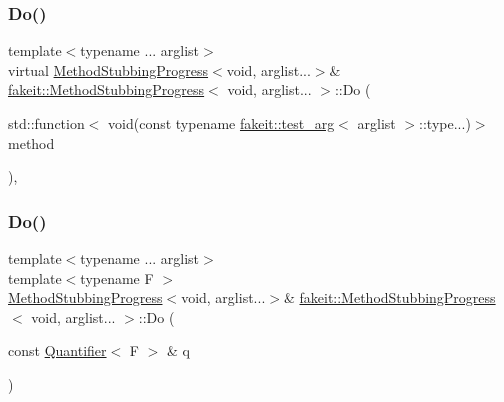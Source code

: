 \mbox{\label{structfakeit_1_1MethodStubbingProgress_3_01void_00_01arglist_8_8_8_01_4_ae41031c8833fad09c16cbbc89569918b}} 
\subsubsection{\texorpdfstring{Do()}{Do()}\hspace{0.1cm}{\footnotesize\ttfamily [16/27]}}
{\footnotesize\ttfamily template$<$typename ... arglist$>$ \\
virtual \mbox{\hyperlink{structfakeit_1_1MethodStubbingProgress}{Method\+Stubbing\+Progress}}$<$void, arglist...$>$\& \mbox{\hyperlink{structfakeit_1_1MethodStubbingProgress}{fakeit\+::\+Method\+Stubbing\+Progress}}$<$ void, arglist... $>$\+::Do (\begin{DoxyParamCaption}\item[{std\+::function$<$ void(const typename \mbox{\hyperlink{structfakeit_1_1test__arg}{fakeit\+::test\+\_\+arg}}$<$ arglist $>$\+::type...)$>$}]{method }\end{DoxyParamCaption})\hspace{0.3cm}{\ttfamily [inline]}, {\ttfamily [virtual]}}

\mbox{\label{structfakeit_1_1MethodStubbingProgress_3_01void_00_01arglist_8_8_8_01_4_a3091661d404ffecf2733281471d536c4}} 
\subsubsection{\texorpdfstring{Do()}{Do()}\hspace{0.1cm}{\footnotesize\ttfamily [17/27]}}
{\footnotesize\ttfamily template$<$typename ... arglist$>$ \\
template$<$typename F $>$ \\
\mbox{\hyperlink{structfakeit_1_1MethodStubbingProgress}{Method\+Stubbing\+Progress}}$<$void, arglist...$>$\& \mbox{\hyperlink{structfakeit_1_1MethodStubbingProgress}{fakeit\+::\+Method\+Stubbing\+Progress}}$<$ void, arglist... $>$\+::Do (\begin{DoxyParamCaption}\item[{const \mbox{\hyperlink{structfakeit_1_1Quantifier}{Quantifier}}$<$ F $>$ \&}]{q }\end{DoxyParamCaption})\hspace{0.3cm}{\ttfamily [inline]}}


